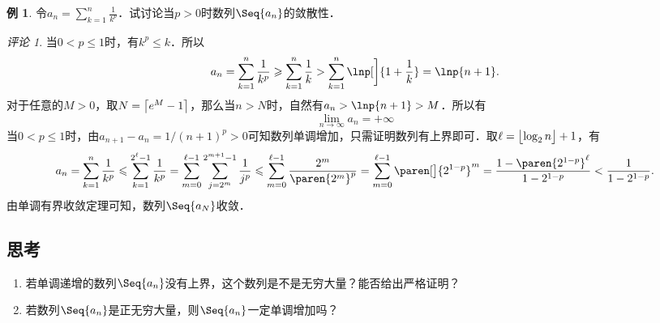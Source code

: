 \documentclass[a4paper,punct=CCT]{ctexbook}
\makeatletter
\theoremstyle{definition}
\newtheorem*{example*}{例}
\theoremstyle{remark}
\newtheorem*{remark}{评论}
\newif\ifshowsolp
\renewcommand*{\proofname}{证}
\renewenvironment{proof}[1][\proofname]{\par
  \pushQED{\qed}%
  \normalfont \topsep6\p@\@plus6\p@\relax
  \trivlist
  \item[\hskip\labelsep
    \bfseries
    #1%
    ]\ignorespaces
}{%
  \popQED\endtrivlist\@endpefalse
}
\let\leq\leqslant
\let\le\leq
\let\geq\geqslant
\let\ge\geq}
\makeatother
\begin{document}
\begin{example*}
  令\(\displaystyle a_n = \sum_{k=1}^n \frac1{k^p}\)．试讨论当\(p > 0\)时数列\(\Seq{a_n}\)的敛散性．

  \begin{remark}
    当\(0 < p \le 1\)时，有\(k^p \le k\)．所以
    \begin{equation*}
      a_n = \sum_{k=1}^n \frac1{k^p} \ge \sum_{k=1}^n \frac1{k}
      > \sum_{k=1}^n \lnp[\bigg]{1+\frac1k} = \lnp{n+1}.
    \end{equation*}
    对于任意的\(M > 0\)，取\(N = \ceil[\big]{e^M - 1}\)，那么当\(n > N\)时，自然有\(a_n > \lnp{n+1} > M\)．所以有
    \begin{equation*}
      \lim_{n\to\infty} a_n = +\infty
    \end{equation*}
    当\(0 < p \le 1\)时，由\(a_{n+1} - a_n = 1/(n+1)^p > 0\)可知数列单调增加，只需证明数列有上界即可．取\(\ell = \floor[\big]{\log_2 n} + 1\)，有
    \begin{equation*}
      a_n
      = \sum_{k=1}^n \frac1{k^p}
      \le \sum_{k=1}^{2^\ell-1} \frac1{k^p}
      = \sum_{m=0}^{\ell-1} \sum_{j=2^m}^{2^{m+1}-1} \frac{1}{j^p}
      \le \sum_{m=0}^{\ell-1} \frac{2^m}{\paren{2^m}^p}
      = \sum_{m=0}^{\ell-1} \paren[\big]{2^{1-p}}^m
      = \frac{1-\paren{2^{1-p}}^\ell}{1-2^{1-p}}
      < \frac{1}{1-2^{1-p}}.
    \end{equation*}
    由单调有界收敛定理可知，数列\(\Seq{a_N}\)收敛．
  \end{remark}
\end{example*}

\subsection*{思考}

\begin{enumerate}
\item 若单调递增的数列\(\Seq{a_n}\)没有上界，这个数列是不是无穷大量？能否给出严格证明？

  \ifshowsolp
  是无穷大量，证明如下．

  \begin{proof}
    因为数列\(\Seq{a_n}\)没有上界，所以对任意的\(M > 0\)都存在一个正整数\(N\)使得\(a_N > M\)．这时，对于所有的\(n > N\)，因为数列\(\Seq{a_n}\)单调递增，所以
    \begin{equation*}
      a_n \ge a_N > M. \qedhere
    \end{equation*}
  \end{proof}
  \fi

\item 若数列\(\Seq{a_n}\)是正无穷大量，则\(\Seq{a_n}\)一定单调增加吗？

  \ifshowsolp
  未必．\(a_n = n + (-1)^n\)，易证\(\lim\limits_{n\to\infty} a_n = +\infty\)．此时，对于任意的正偶数\(k\)都有
  \begin{equation*}
    a_{k+1} = (k+1) + (-1)^{k+1} = k < k + 1 = k + (-1)^k = a_k.
  \end{equation*}
  \fi
\end{enumerate}
\end{document}
